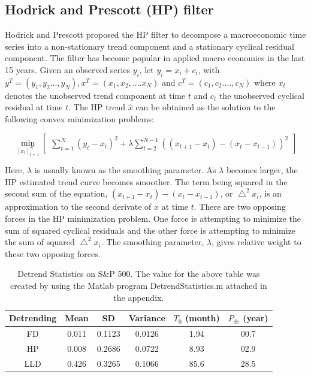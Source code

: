 \subsection{Hodrick and Prescott (HP) filter}
Hodrick and Prescott proposed the HP filter to decompose a macroeconomic time series into a non-stationary trend component and a stationary cyclical residual component. The filter has become popular in applied macro economics in the last 15 years.  Given an observed series $y_i$, let $y_i = x_i + c_i$, with $y^T = (y_1,y_2..., y_N), x^T = (x_1,x_2,....x_N)$ and $c^T = (c_1,c_2...., c_N)$ where $x_t$ denotes the unobserved trend component at time $t$ and $c_t$ the unobserved cyclical residual at time $t$. The HP trend $\hat{x}$ can be obtained as the solution to the following convex minimization problems:



\begin{equation}
\min_{[x_t]_{t=1}^{N}}  \begin{bmatrix} \sum_{t=1}^{N} (y_t - x_t)^2 +\lambda \sum_{t=2}^{N-1} ( ( x_{t+1} - x_t) - (x_t - x_{t-1}))^2  \end{bmatrix}
\end{equation}

Here, $\lambda$ is usually known as the smoothing parameter. As $\lambda$ becomes larger, the HP estimated trend curve becomes smoother. The term being squared in the second sum of the equation, $( x_{t+1} - x_t) - (x_t - x_{t-1})$, or $\bigtriangleup^{2}x_i$, is an approximation to the second derivate of $x$ at time $t$. There are two opposing forces in the HP minimization problem. One force is attempting to minimize the sum of squared cyclical residuals and the other force is attempting to minimize the sum of squared $\bigtriangleup^{2}x_i$. The smoothing parameter, $\lambda$, gives relative weight to these two opposing forces. 

\begin{table}[h!]
\centering
\begin{tabular}{||c c c c c c ||} 
 \hline
 Detrending & Mean & SD & Variance & $T_{0}$ (month) & $P_{dc}$ (year) \\ [0.5ex] 
 \hline\hline
 FD & 0.011 & 0.1123 & 0.0126 & 1.94 & 00.7 \\
 HP & 0.008 & 0.2686 & 0.0722 & 8.93 & 02.9 \\
 LLD & 0.426 & 0.3265 & 0.1066 & 85.6 & 28.5  \\
 \hline
\end{tabular}
\caption{Detrend Statistics on S\&P 500. The value for the above table was created by using the Matlab program DetrendStatistics.m attached in the appendix.  }
\label{table:sp500trendstat}
\end{table}


